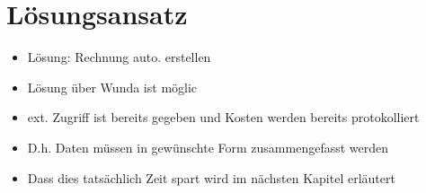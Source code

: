 \section{Lösungsansatz}
\begin{itemize}
\item Lösung: Rechnung auto. erstellen
\item Lösung über Wunda ist möglic
\item ext. Zugriff ist bereits gegeben und Kosten werden bereits protokolliert
\item D.h. Daten müssen in gewünschte Form zusammengefasst werden
\item Dass dies tatsächlich Zeit spart wird im nächsten Kapitel erläutert
\end{itemize}